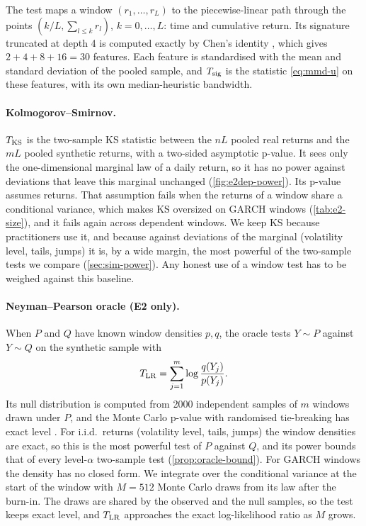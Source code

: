 The \SigMMD{} test \citep{chevyrev2022signature,kiraly2019kernels} maps a window
$(r_1,\dots,r_L)$ to the piecewise-linear path through the points
$(k/L,\sum_{l\le k}r_l)$, $k=0,\dots,L$: time and cumulative return. Its signature truncated at
depth 4 is computed exactly by Chen's identity \citep{lyons1998differential,chevyrev2016primer},
which gives $2+4+8+16=30$ features. Each feature is standardised with the mean and standard
deviation of the pooled sample, and $T_{\mathrm{sig}}$ is the statistic \eqref{eq:mmd-u} on these features,
with its own median-heuristic bandwidth.

\paragraph{Kolmogorov--Smirnov.}
$T_{\mathrm{KS}}$ is the two-sample KS statistic between the $nL$ pooled real returns and the $mL$ pooled
synthetic returns, with a two-sided asymptotic p-value. It sees only the one-dimensional
marginal law of a daily return, so it has no power against deviations that leave this marginal
unchanged (\cref{fig:e2dep-power}). Its p-value assumes \iid{} returns. That assumption fails
when the returns of a window share a conditional variance, which makes KS oversized on GARCH
windows (\cref{tab:e2-size}), and it fails again across dependent windows. We keep KS because
practitioners use it, and because against deviations of the marginal (volatility level, tails,
jumps) it is, by a wide margin, the most powerful of the two-sample tests we compare
(\cref{sec:sim-power}).
Any honest use of a window test has to be weighed against this baseline.

\paragraph{Neyman--Pearson oracle (E2 only).}
When $P$ and $Q$ have known window densities $p,q$, the oracle tests $Y\sim P$ against
$Y\sim Q$ on the synthetic sample with
\begin{equation}\label{eq:lr-oracle}
  T_{\mathrm{LR}}=\sum_{j=1}^m\log\frac{q(Y_j)}{p(Y_j)}.
\end{equation}
Its null distribution is computed from 2000 independent samples of $m$ windows drawn under $P$,
and the Monte Carlo p-value with randomised tie-breaking has exact level
\citep{dufour_2006_monte}. For i.i.d.\ returns (volatility level, tails, jumps) the window
densities are exact, so this is the most powerful test of $P$ against $Q$, and its power bounds
that of every level-$\alpha$ two-sample test (\cref{prop:oracle-bound}). For GARCH windows the
density has no closed form. We integrate over the conditional variance at the start of the
window with $M=512$ Monte Carlo draws from its law after the burn-in. The draws are shared by
the observed and the null samples, so the test keeps exact level, and $T_{\mathrm{LR}}$ approaches the
exact log-likelihood ratio as $M$ grows.

